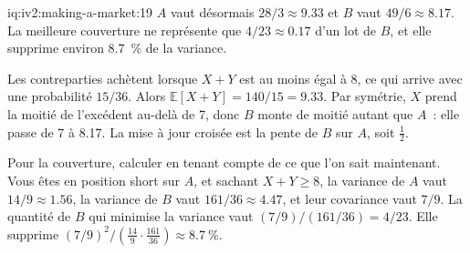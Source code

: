 \begin{solution}{iq:iv2:making-a-market:19}
$A$ vaut désormais $28/3 \approx 9.33$ et $B$ vaut $49/6 \approx 8.17$. La meilleure couverture ne représente que $4/23 \approx 0.17$ d'un lot de $B$, et elle supprime environ 8.7~\% de la variance.

Les contreparties achètent lorsque $X + Y$ est au moins égal à 8, ce qui arrive avec une probabilité $15/36$. Alors $\mathbb{E}[X + Y] = 140/15 = 9.33$. Par symétrie, $X$ prend la moitié de l'excédent au-delà de 7, donc $B$ monte de moitié autant que $A$~: elle passe de 7 à 8.17. La mise à jour croisée est la pente de $B$ sur $A$, soit $\tfrac12$.

Pour la couverture, calculer en tenant compte de ce que l'on sait maintenant. Vous êtes en position short sur $A$, et sachant $X + Y \ge 8$, la variance de $A$ vaut $14/9 \approx 1.56$, la variance de $B$ vaut $161/36 \approx 4.47$, et leur covariance vaut $7/9$. La quantité de $B$ qui minimise la variance vaut $(7/9)/(161/36) = 4/23$. Elle supprime $(7/9)^2/\left(\tfrac{14}{9} \cdot \tfrac{161}{36}\right) \approx 8.7~\%$.

\end{solution}

